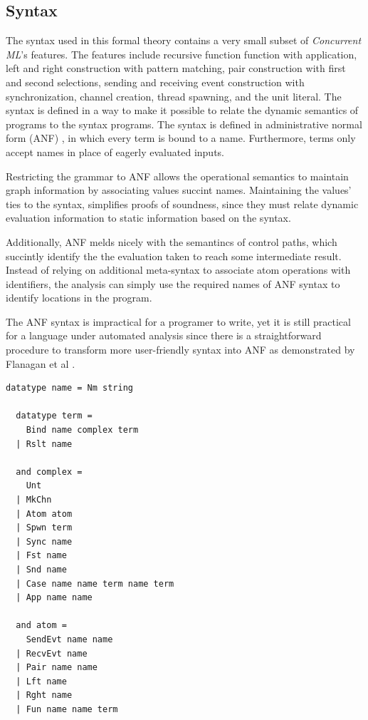 \documentclass[10pt]{article}
\begin{document}
\subsection{Syntax}
The syntax used in this formal theory contains a very small subset of
\textit{Concurrent ML}'s features. The features include recursive function function with
application, left and right construction with pattern matching, pair construction with first
and second selections, sending and receiving event construction with synchronization,
channel creation, thread spawning, and the unit literal. The syntax is defined in a way to
make it possible to relate the dynamic semantics of programs to the syntax programs.
The syntax is defined in administrative normal form (ANF) \cite{}, in which every term
is bound to a name. Furthermore, terms only accept names in place of eagerly evaluated
inputs. 

Restricting the grammar to ANF allows the operational semantics
to maintain graph information by associating values succint names.
Maintaining the values' ties to the syntax,
simplifies proofs of soundness, since they must relate dynamic evaluation information
to static information based on the syntax.

Additionally, ANF melds nicely with the semantincs of control paths, which succintly identify
the the evaluation taken to reach some intermediate result.
Instead of relying on additional meta-syntax to associate atom operations with identifiers,
the analysis can simply use the required names of ANF syntax to identify locations in the program.

The ANF syntax is impractical for a programer to write,
yet it is still practical for a language under automated analysis
since there is a straightforward procedure to transform
more user-friendly syntax into ANF as demonstrated by Flanagan et al \cite{}.


\begin{lstlisting}[language=logic]
  datatype name = Nm string

  datatype term = 
    Bind name complex term 
  | Rslt name

  and complex = 
    Unt
  | MkChn
  | Atom atom
  | Spwn term 
  | Sync name
  | Fst name
  | Snd name
  | Case name name term name term 
  | App name name

  and atom = 
    SendEvt name name
  | RecvEvt name
  | Pair name name
  | Lft name
  | Rght name
  | Fun name name term 
\end{lstlisting}
\end{document}
